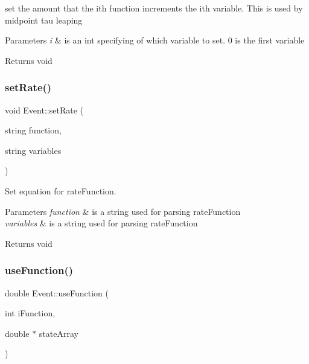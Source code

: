 set the amount that the ith function increments the ith variable. This is used by midpoint tau leaping 


\begin{DoxyParams}{Parameters}
{\em i} & is an int specifying of which variable to set. 0 is the first variable \\
\hline
\end{DoxyParams}
\begin{DoxyReturn}{Returns}
void 
\end{DoxyReturn}
\mbox{\label{class_event_a993a01984496bc158be92b67422f8655}} 
\subsubsection{\texorpdfstring{set\+Rate()}{setRate()}}
{\footnotesize\ttfamily void Event\+::set\+Rate (\begin{DoxyParamCaption}\item[{string}]{function,  }\item[{string}]{variables }\end{DoxyParamCaption})}



Set equation for rate\+Function. 


\begin{DoxyParams}{Parameters}
{\em function} & is a string used for parsing rate\+Function \\
\hline
{\em variables} & is a string used for parsing rate\+Function \\
\hline
\end{DoxyParams}
\begin{DoxyReturn}{Returns}
void 
\end{DoxyReturn}
\mbox{\label{class_event_a2637844b7f9583caf0f808c898dc2246}} 
\subsubsection{\texorpdfstring{use\+Function()}{useFunction()}}
{\footnotesize\ttfamily double Event\+::use\+Function (\begin{DoxyParamCaption}\item[{int}]{i\+Function,  }\item[{double $\ast$}]{state\+Array }\end{DoxyParamCaption})}



